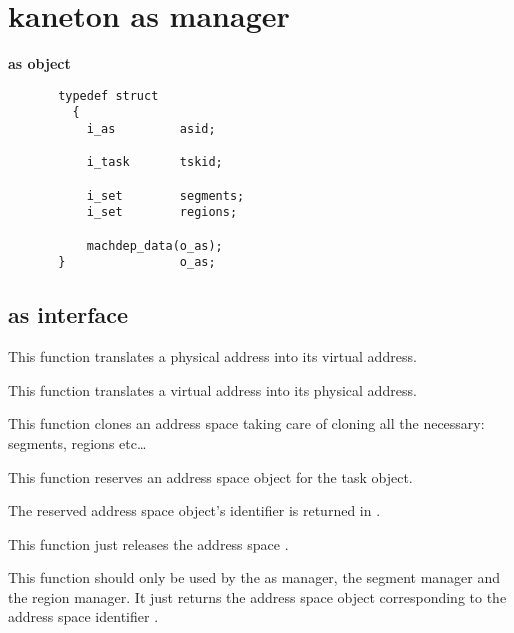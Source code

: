 \section{kaneton as manager}

{\large {\bf as object}}

\begin{verbatim}
       typedef struct
         {
           i_as         asid;

           i_task       tskid;

           i_set        segments;
           i_set        regions;

           machdep_data(o_as);
       }                o_as;
\end{verbatim}

\subsection*{as interface}

	 {
	   This function translates a physical address into its virtual
	   address.
	 }

	 {
	   This function translates a virtual address into its physical
	   address.
	 }

	 {
	   This function clones an address space taking care of cloning
	   all the necessary: segments, regions etc\ldots
	 }

	 {
	   This function reserves an address space object for the
	   task  object.

	   The reserved address space object's identifier is returned
	   in .
	 }

	 {
	   This function just releases the address space .
	 }

	 {
	   This function should only be used by the as manager, the segment
	   manager and the region manager. It just returns the address space
	   object corresponding to the address space identifier .
	 }



